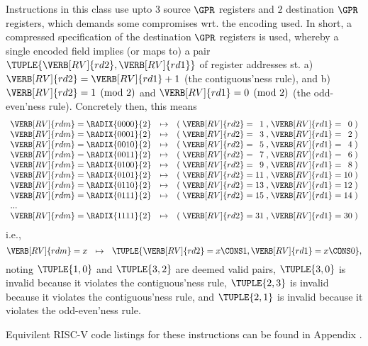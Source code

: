 Instructions in this class use upto
$3$ source      $\GPR$ registers
and
$2$ destination $\GPR$ registers,
which demands some compromises wrt. the encoding used.
In short, a compressed specification of the destination $\GPR$ registers is
used, whereby a single encoded  field implies (or maps to) a 
pair 
$
\TUPLE{ \VERB[RV]{rd2}, \VERB[RV]{rd1} }
$
of register addresses st.
a) $\VERB[RV]{rd2} = \VERB[RV]{rd1} + 1$
   (the contiguous'ness rule),
   and
b) $\VERB[RV]{rd2} = 1 \pmod{2}$
   and 
   $\VERB[RV]{rd1} = 0 \pmod{2}$
   (the  odd-even'ness rule).
Concretely then, this means
\[
\begin{array}{l@{\;}c@{\;}r c c@{\;}l@{\;}c@{\;}r@{\;}c@{\;}l@{\;}c@{\;}r@{\;}c}
\VERB[RV]{rdm} &=& \RADIX{0000}{2} &\mapsto& ( & \VERB[RV]{rd2} &=&  1 &,& \VERB[RV]{rd1} &=&  0 & ) \\
\VERB[RV]{rdm} &=& \RADIX{0001}{2} &\mapsto& ( & \VERB[RV]{rd2} &=&  3 &,& \VERB[RV]{rd1} &=&  2 & ) \\
\VERB[RV]{rdm} &=& \RADIX{0010}{2} &\mapsto& ( & \VERB[RV]{rd2} &=&  5 &,& \VERB[RV]{rd1} &=&  4 & ) \\
\VERB[RV]{rdm} &=& \RADIX{0011}{2} &\mapsto& ( & \VERB[RV]{rd2} &=&  7 &,& \VERB[RV]{rd1} &=&  6 & ) \\
\VERB[RV]{rdm} &=& \RADIX{0100}{2} &\mapsto& ( & \VERB[RV]{rd2} &=&  9 &,& \VERB[RV]{rd1} &=&  8 & ) \\
\VERB[RV]{rdm} &=& \RADIX{0101}{2} &\mapsto& ( & \VERB[RV]{rd2} &=& 11 &,& \VERB[RV]{rd1} &=& 10 & ) \\
\VERB[RV]{rdm} &=& \RADIX{0110}{2} &\mapsto& ( & \VERB[RV]{rd2} &=& 13 &,& \VERB[RV]{rd1} &=& 12 & ) \\
\VERB[RV]{rdm} &=& \RADIX{0111}{2} &\mapsto& ( & \VERB[RV]{rd2} &=& 15 &,& \VERB[RV]{rd1} &=& 14 & ) \\
... \\
\VERB[RV]{rdm} &=& \RADIX{1111}{2} &\mapsto& ( & \VERB[RV]{rd2} &=& 31 &,& \VERB[RV]{rd1} &=& 30 & ) \\
\end{array}
\]
i.e.,
\[
\VERB[RV]{rdm} = x ~~\mapsto~~ \TUPLE{ \VERB[RV]{rd2} = x \CONS 1 , \VERB[RV]{rd1} = x \CONS 0 } ,
\]
noting
$\TUPLE{ 1, 0 }$ and $\TUPLE{ 3, 2 }$ are deemed valid pairs,
$\TUPLE{ 3, 0 }$ is invalid because it violates the contiguous'ness rule,
$\TUPLE{ 2, 3 }$ is invalid because it violates the contiguous'ness rule,
and
$\TUPLE{ 2, 1 }$ is invalid because it violates the  odd-even'ness rule.

Equivilent RISC-V code listings for these instructions can be found
in Appendix .


